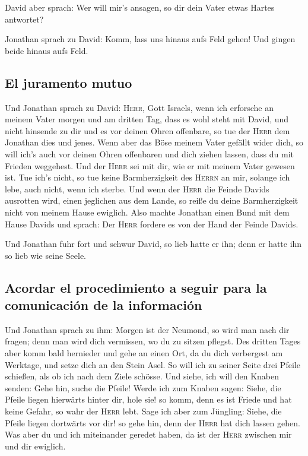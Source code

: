  David aber sprach: Wer will mir's ansagen, so dir dein
Vater etwas Hartes antwortet?

 Jonathan sprach zu David: Komm, lass uns hinaus aufs
Feld gehen! Und gingen beide hinaus aufs Feld.

\hypertarget{el-juramento-mutuo}{%
\subsection{El juramento mutuo}\label{el-juramento-mutuo}}

 Und Jonathan sprach zu David: \textsc{Herr}, Gott
Israels, wenn ich erforsche an meinem Vater morgen und am dritten Tag,
dass es wohl steht mit David, und nicht hinsende zu dir und es vor
deinen Ohren offenbare,  so tue der \textsc{Herr} dem
Jonathan dies und jenes. Wenn aber das Böse meinem Vater gefällt wider
dich, so will ich's auch vor deinen Ohren offenbaren und dich ziehen
lassen, dass du mit Frieden weggehest. Und der \textsc{Herr} sei mit
dir, wie er mit meinem Vater gewesen ist.  Tue ich's
nicht, so tue keine Barmherzigkeit des \textsc{Herrn} an mir, solange
ich lebe, auch nicht, wenn ich sterbe.  Und wenn der
\textsc{Herr} die Feinde Davids ausrotten wird, einen jeglichen aus dem
Lande, so reiße du deine Barmherzigkeit nicht von meinem Hause ewiglich.
 Also machte Jonathan einen Bund mit dem Hause Davids und
sprach: Der \textsc{Herr} fordere es von der Hand der Feinde Davids.

 Und Jonathan fuhr fort und schwur David, so lieb hatte
er ihn; denn er hatte ihn so lieb wie seine Seele.

\hypertarget{acordar-el-procedimiento-a-seguir-para-la-comunicaciuxf3n-de-la-informaciuxf3n}{%
\subsection{Acordar el procedimiento a seguir para la comunicación de la
información}\label{acordar-el-procedimiento-a-seguir-para-la-comunicaciuxf3n-de-la-informaciuxf3n}}

 Und Jonathan sprach zu ihm: Morgen ist der Neumond, so
wird man nach dir fragen; denn man wird dich vermissen, wo du zu sitzen
pflegst.  Des dritten Tages aber komm bald hernieder und
gehe an einen Ort, da du dich verbergest am Werktage, und setze dich an
den Stein Asel.  So will ich zu seiner Seite drei Pfeile
schießen, als ob ich nach dem Ziele schösse.  Und siehe,
ich will den Knaben senden: Gehe hin, suche die Pfeile! Werde ich zum
Knaben sagen: Siehe, die Pfeile liegen hierwärts hinter dir, hole sie!
so komm, denn es ist Friede und hat keine Gefahr, so wahr der
\textsc{Herr} lebt.  Sage ich aber zum Jüngling: Siehe,
die Pfeile liegen dortwärts vor dir! so gehe hin, denn der \textsc{Herr}
hat dich lassen gehen.  Was aber du und ich miteinander
geredet haben, da ist der \textsc{Herr} zwischen mir und dir ewiglich.


